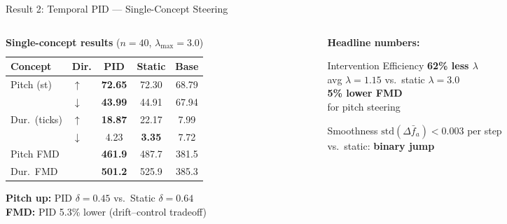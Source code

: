 \documentclass[aspectratio=169, 11pt]{beamer}
\begin{document}
\begin{frame}{Result 2: Temporal PID --- Single-Concept Steering}

\begin{columns}[T]
\begin{column}{0.52\textwidth}
\begin{table}
\centering\small
\caption*{\textbf{Single-concept results} ($n{=}40$, $\lambda_\text{max}{=}3.0$)}
\begin{tabular}{llccc}
  \toprule
  Concept & Dir. & \textbf{PID} & Static & Base \\
  \midrule
  \multirow{2}{*}{Pitch (st)} & $\uparrow$ & \textbf{72.65} & 72.30 & 68.79 \\
  & $\downarrow$ & \textbf{43.99} & 44.91 & 67.94 \\
  \multirow{2}{*}{Dur.\ (ticks)} & $\uparrow$ & \textbf{18.87} & 22.17 & 7.99 \\
  & $\downarrow$ & 4.23 & \textbf{3.35} & 7.72 \\
  \midrule
  \multicolumn{2}{l}{Pitch FMD} & \textbf{461.9} & 487.7 & 381.5 \\
  \multicolumn{2}{l}{Dur.\ FMD} & \textbf{501.2} & 525.9 & 385.3 \\
  \bottomrule
\end{tabular}
\end{table}

\vspace{0.2em}
\small
\textbf{Pitch up:} PID $\delta{=}0.45$ vs.\ Static $\delta{=}0.64$\\
\textbf{FMD:} PID 5.3\% lower (drift--control tradeoff)
\end{column}

\begin{column}{0.44\textwidth}
\textbf{Headline numbers:}

\vspace{0.3em}
\begin{block}{Intervention Efficiency}
\centering\large
\textbf{62\% less $\lambda$}\\[0.2em]
\small avg $\lambda{=}1.15$ vs.\ static $\lambda{=}3.0$\\[0.3em]
\large \textbf{5\% lower FMD}\\[0.2em]
\small for pitch steering
\end{block}

\vspace{0.3em}
\begin{block}{Smoothness}
\small
$\text{std}(\Delta\bar{f}_a) < 0.003$ per step\\
vs.\ static: \textbf{binary jump}
\end{block}


\end{column}
\end{columns}
\end{frame}
\end{document}
